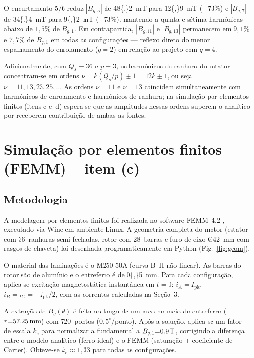 \documentclass[12pt,a4paper]{article}
\begin{document}
O encurtamento $5/6$ reduz $|B_{g,5}|$ de \SI{48{,}2}{mT} para \SI{12{,}9}{mT}
($-73\%$) e $|B_{g,7}|$ de \SI{34{,}4}{mT} para \SI{9{,}2}{mT} ($-73\%$),
mantendo a quinta e sétima harmônicas abaixo de $1{,}5\%$ de $B_{g,1}$.
Em contrapartida, $|B_{g,11}|$ e $|B_{g,13}|$ permanecem em $9{,}1\%$ e $7{,}7\%$
de $B_{g,1}$ em todas as configurações --- reflexo direto do menor espalhamento
do enrolamento ($q{=}2$) em relação ao projeto com $q{=}4$.

Adicionalmente, com $Q_s{=}36$ e $p{=}3$, os harmônicos de ranhura do estator
concentram-se em ordens $\nu{=}k(Q_s/p){\pm}1{=}12k{\pm}1$, ou seja
$\nu{=}11,13,23,25,\ldots$ As ordens $\nu{=}11$ e $\nu{=}13$ coincidem
simultaneamente com harmônicos de enrolamento e harmônicos de ranhura;
na simulação por elementos finitos (itens c e~d) espera-se que as amplitudes
nessas ordens superem o analítico por receberem contribuição de ambas as fontes.

\section{Simulação por elementos finitos (FEMM) -- item (c)}

\subsection*{Metodologia}

A modelagem por elementos finitos foi realizada no software FEMM~4.2
\cite{femm}, executado via Wine em ambiente Linux.
A geometria completa do motor (estator com 36~ranhuras semi-fechadas,
rotor com 28~barras e furo de eixo Ø42~mm com rasgos de chaveta)
foi desenhada programaticamente em Python (Fig.~\ref{fig:geom}).

O material das laminações é o M250-50A (curva B--H não linear).
As barras do rotor são de alumínio e o entreferro é de \SI{0{,}5}{mm}.
Para cada configuração, aplica-se excitação magnetostática instantânea
em $t{=}0$: $i_A{=}I_\text{pk}$, $i_B{=}i_C{=}{-}I_\text{pk}/2$,
com as correntes calculadas na Seção~3.

A extração de $B_g(\theta)$ é feita ao longo de um arco no meio do
entreferro ($r{=}\SI{57{,}25}{mm}$) com 720~pontos ($0{,}5^{\circ}$/ponto).
Após a solução, aplica-se um fator de escala $k_e$ para normalizar
a fundamental a $B_{g,1}{=}\SI{0{,}9}{T}$, corrigindo a diferença entre
o modelo analítico (ferro ideal) e o FEMM (saturação + coeficiente de Carter).
Obteve-se $k_e{\approx}1{,}33$ para todas as configurações.
\end{document}
